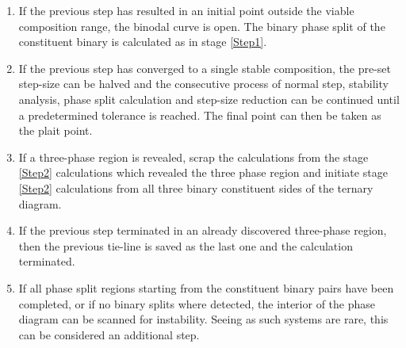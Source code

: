 \begin{enumerate}
\item If the previous step has resulted in an initial point outside the viable composition range, the binodal curve is open. The binary phase split of the constituent binary is calculated as in stage \ref{Step1}.\label{Step3}\
\item If the previous step has converged to a single stable composition, the pre-set step-size can be halved and the consecutive process of normal step, stability analysis, phase split calculation and step-size reduction can be continued until a predetermined tolerance is reached. The final point can then be taken as the plait point.\label{Step4}\
\item If a three-phase region is revealed, scrap the calculations from the stage \ref{Step2} calculations which revealed the three phase region and initiate stage \ref{Step2} calculations from all three binary constituent sides of the ternary diagram.\label{Step5}\
\item If the previous step terminated in an already discovered three-phase region, then the previous tie-line is saved as the last one and the calculation terminated.\label{Step6}\
\item If all phase split regions starting from the constituent binary pairs have been completed, or if no binary splits where detected, the interior of the phase diagram can be scanned for instability. Seeing as such systems are rare, this can be considered an additional step.\label{Step7}\
\end{enumerate}
	
	





